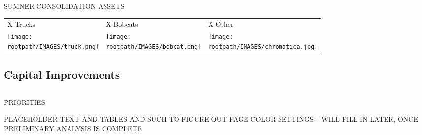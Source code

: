 \textcolor{ccorange}{SUMNER CONSOLIDATION ASSETS}
\begin{table}[H]
\begin{tabular}{m{}m{}m{}}
{\color{ccorange} X Trucks} & {\color{ccorange} X Bobcats} & {\color{ccorange} X Other} \\
\texttt{[image: \\rootpath/IMAGES/truck.png]}                            & \texttt{[image: \\rootpath/IMAGES/bobcat.png]}                             & \texttt{[image: \\rootpath/IMAGES/chromatica.jpg]}                          
\end{tabular}
\end{table}
\pagebreak
\textcolor{ccorange}{\section{Capital Improvements}}


\begin{table}[H]
\small
\begin{tabular}{l}
\\

\end{tabular}
\end{table}
\pagebreak

\textcolor{ccorange}{PRIORITIES}

PLACEHOLDER TEXT AND TABLES AND SUCH TO FIGURE OUT PAGE COLOR SETTINGS -- WILL FILL IN LATER, ONCE PRELIMINARY ANALYSIS IS COMPLETE
\pagebreak
\pagestyle{plain}
\pagecolor{ccfuschia}
\pagebreak
{}
\pagestyle{fancy}
\fancyhf{}
\renewcommand{\chaptermark}[1]{\markboth{#1}{}}
\fancyfoot[LE,RO]{\thepage}


